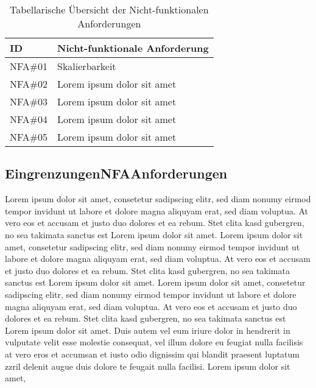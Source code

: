 \begin{table}[ht]
    \centering
    \begin{tabularx}{\textwidth}{@{}lX@{}}
    \toprule
    ID & Nicht-funktionale Anforderung \\ 
    \midrule
    NFA\#01 & Skalierbarkeit \\
    NFA\#02 & Lorem ipsum dolor sit amet \\
    NFA\#03 & Lorem ipsum dolor sit amet \\
    NFA\#04 & Lorem ipsum dolor sit amet \\
    NFA\#05 & Lorem ipsum dolor sit amet \\
    \bottomrule
    \end{tabularx}
    \caption{Tabellarische Übersicht der Nicht-funktionalen Anforderungen}
    \label{tab: NFA-tabelle}
    \end{table}

\subsection{EingrenzungenNFAAnforderungen}
Lorem ipsum dolor sit amet, consetetur sadipscing elitr, sed diam nonumy eirmod tempor invidunt ut labore et dolore magna aliquyam erat, sed diam voluptua. At vero eos et accusam et justo duo dolores et ea rebum. Stet clita kasd gubergren, no sea takimata sanctus est Lorem ipsum dolor sit amet. Lorem ipsum dolor sit amet, consetetur sadipscing elitr, sed diam nonumy eirmod tempor invidunt ut labore et dolore magna aliquyam erat, sed diam voluptua. At vero eos et accusam et justo duo dolores et ea rebum. Stet clita kasd gubergren, no sea takimata sanctus est Lorem ipsum dolor sit amet. Lorem ipsum dolor sit amet, consetetur sadipscing elitr, sed diam nonumy eirmod tempor invidunt ut labore et dolore magna aliquyam erat, sed diam voluptua. At vero eos et accusam et justo duo dolores et ea rebum. Stet clita kasd gubergren, no sea takimata sanctus est Lorem ipsum dolor sit amet.   
Duis autem vel eum iriure dolor in hendrerit in vulputate velit esse molestie consequat, vel illum dolore eu feugiat nulla facilisis at vero eros et accumsan et iusto odio dignissim qui blandit praesent luptatum zzril delenit augue duis dolore te feugait nulla facilisi. Lorem ipsum dolor sit amet,




